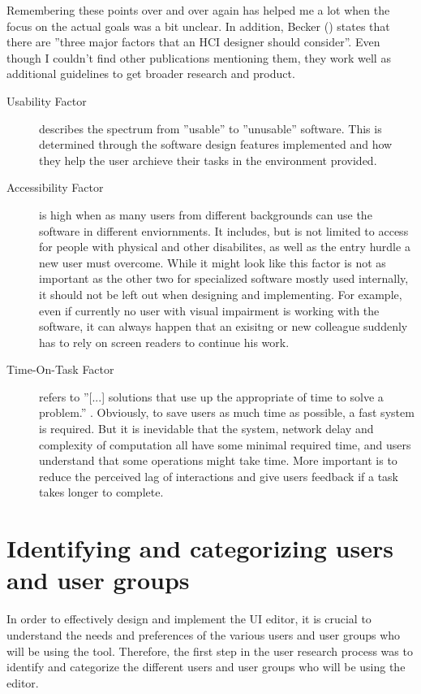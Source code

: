 Remembering these points over and over again has helped me a lot when the focus on the actual goals was a bit unclear.
In addition, Becker (\cite[pp. 37-41]{LearnHCI:2020ys}) states that there are ''three major factors that an HCI designer should consider''.
Even though I couldn't find other publications mentioning them, they work well as additional guidelines to get broader research and product.
\begin{description}
  \item[Usability Factor] describes the spectrum from ''usable'' to ''unusable'' software. This is determined through the software design features implemented and how they help the user archieve their tasks in the environment provided.
  \item[Accessibility Factor] is high when as many users from different backgrounds can use the software in different enviornments. It includes, but is not limited to access for people with physical and other disabilites, as well as the entry hurdle a new user must overcome.
While it might look like this factor is not as important as the other two for specialized software mostly used internally, it should not be left out when designing and implementing. For example, even if currently no user with visual impairment is working with the software, it can always happen that an exisitng or new colleague suddenly has to rely on screen readers to continue his work.
  \item[Time-On-Task Factor] refers to ''[...] solutions that use up the appropriate of time to solve a problem.'' \Cite[p. 40]{LearnHCI:2020ys}. Obviously, to save users as much time as possible, a fast system is required.
But it is inevidable that the system, network delay and complexity of computation all have some minimal required time, and users understand that some operations might take time. More important is to reduce the perceived lag of interactions and give users feedback if a task takes longer to complete.
\end{description}

\section{Identifying and categorizing users and user groups}
\label{sec:user-groups}
In order to effectively design and implement the UI editor, it is crucial to understand the needs and preferences of the various users and user groups who will be using the tool.
Therefore, the first step in the user research process was to identify and categorize the different users and user groups who will be using the editor.

